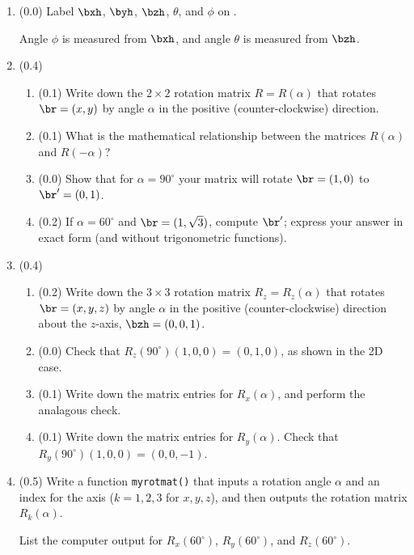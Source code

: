 \documentclass[11pt,titlepage,fleqn]{article}
\newcommand{\rotangA}{\alpha}
\newcommand{\Rmat}{R}
\begin{document}
\begin{enumerate}

\item (0.0) Label $\bxh$, $\byh$, $\bzh$, $\theta$, and $\phi$ on .

Angle $\phi$ is measured from $\bxh$, and angle $\theta$ is measured from $\bzh$.

\item (0.4) 

\begin{enumerate}
\item (0.1) Write down the $2 \times 2$ rotation matrix $\Rmat = \Rmat(\rotangA)$ that rotates $\br = (x,y)$ by angle $\rotangA$ in the positive (counter-clockwise) direction.
\item (0.1) What is the mathematical relationship between the matrices $\Rmat(\rotangA)$ and $\Rmat(-\rotangA)$?
\item (0.0) Show that for $\rotangA = 90^\circ$ your matrix will rotate $\br = (1,0)$ to $\br' = (0,1)$.
\item (0.2) If $\rotangA = 60^\circ$ and $\br = (1,\sqrt{3})$, compute $\br'$; express your answer in exact form (and without trigonometric functions).
\end{enumerate}

\item (0.4)

\begin{enumerate}
\item (0.2) Write down the $3 \times 3$ rotation matrix $\Rmat_z = \Rmat_z(\rotangA)$ that rotates $\br = (x,y,z)$ by angle $\rotangA$ in the positive (counter-clockwise) direction about the $z$-axis, $\bzh = (0,0,1)$.
\item (0.0) Check that $\Rmat_z(90^\circ)(1,0,0) = (0,1,0)$, as shown in the 2D case.
\item (0.1) Write down the matrix entries for $\Rmat_x(\rotangA)$, and perform the analagous check.
\item (0.1) Write down the matrix entries for $\Rmat_y(\rotangA)$. Check that $\Rmat_y(90^\circ)(1,0,0) = (0,0,-1)$.
\end{enumerate}

\item (0.5) Write a function \verb+myrotmat()+ that inputs a rotation angle $\rotangA$ and an index for the axis ($k = 1,2,3$ for $x,y,z$), and then outputs the rotation matrix $\Rmat_k(\rotangA)$. 

List the computer output for $\Rmat_x(60^\circ)$, $\Rmat_y(60^\circ)$, and $\Rmat_z(60^\circ)$.


\end{enumerate}
\end{document}
